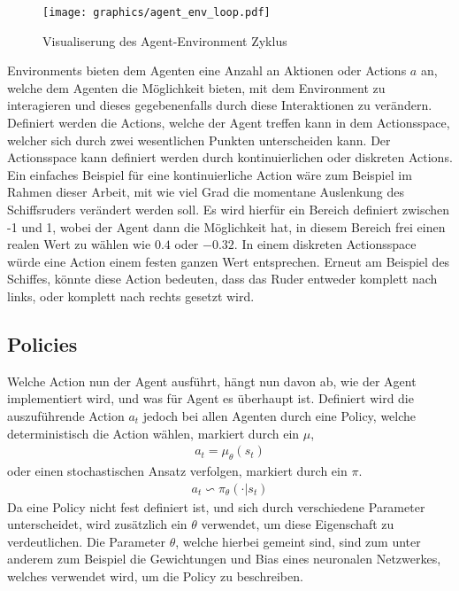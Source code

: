 \documentclass[]{iat}
\begin{document}
\begin{figure}[H]
    \texttt{[image: graphics/agent\_env\_loop.pdf]}
    \centering
    \caption{Visualiserung des Agent-Environment Zyklus}
    \label{abb:agent_env_loop}
\end{figure}

Environments bieten dem Agenten eine Anzahl an Aktionen oder Actions $a$ an, welche dem Agenten die Möglichkeit bieten, mit dem Environment zu interagieren und dieses gegebenenfalls durch diese Interaktionen zu verändern. Definiert werden die Actions, welche der Agent treffen kann in dem Actionsspace, welcher sich durch zwei wesentlichen Punkten unterscheiden kann. Der Actionsspace kann definiert werden durch kontinuierlichen oder diskreten Actions. Ein einfaches Beispiel für eine kontinuierliche Action wäre zum Beispiel im Rahmen dieser Arbeit, mit wie viel Grad die momentane Auslenkung des Schiffsruders verändert werden soll. Es wird hierfür ein Bereich definiert zwischen -1 und 1, wobei der Agent dann die Möglichkeit hat, in diesem Bereich frei einen realen Wert zu wählen wie $0.4$ oder $-0.32$. In einem diskreten Actionsspace würde eine Action einem festen ganzen Wert entsprechen. Erneut am Beispiel des Schiffes, könnte diese Action bedeuten, dass das Ruder entweder komplett nach links, oder komplett nach rechts gesetzt wird.

\subsection{Policies}
Welche Action nun der Agent ausführt, hängt nun davon ab, wie der Agent implementiert wird, und was für Agent es überhaupt ist. Definiert wird die auszuführende Action $a_t$ jedoch bei allen Agenten durch eine Policy, welche deterministisch die Action wählen, markiert durch ein $\mu$,
\begin{align}
    a_t = \mu_\theta(s_t)
\end{align}
oder einen stochastischen Ansatz verfolgen, markiert durch ein $\pi$.
\begin{align}
    a_t \backsim \pi_\theta (\cdot | s_t)
\end{align}
Da eine Policy nicht fest definiert ist, und sich durch verschiedene Parameter unterscheidet, wird zusätzlich ein $\theta$ verwendet, um diese Eigenschaft zu verdeutlichen. Die Parameter $\theta$, welche hierbei gemeint sind, sind zum unter anderem zum Beispiel die Gewichtungen und Bias eines neuronalen Netzwerkes, welches verwendet wird, um die Policy zu beschreiben.
\end{document}
